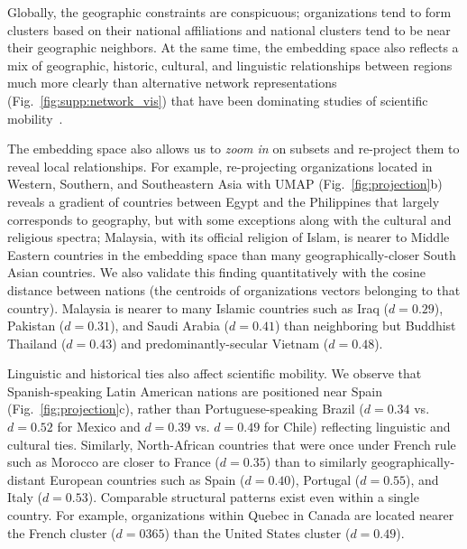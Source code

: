 \documentclass[12pt]{article} %
\begin{document}
Globally, the geographic constraints are conspicuous; organizations tend to form clusters based on their national affiliations and national clusters tend to be near their geographic neighbors.
At the same time, the embedding space also reflects a mix of geographic, historic, cultural, and linguistic relationships between regions much more clearly than alternative network representations (Fig.~\ref{fig:supp:network_vis}) that have been dominating studies of scientific mobility~\autocite{chinchilla2018global, czaika2018globalisation}.

The embedding space also allows us to \textit{zoom in} on subsets and re-project them to reveal local relationships.
For example, re-projecting organizations located in Western, Southern, and Southeastern Asia with UMAP (Fig.~\ref{fig:projection}b) reveals a gradient of countries between Egypt and the Philippines that largely corresponds to geography, but with some exceptions along with the cultural and religious spectra;
Malaysia, with its official religion of Islam, is nearer to Middle Eastern countries in the embedding space than many geographically-closer South Asian countries.
We also validate this finding quantitatively with the cosine distance between nations (the centroids of organizations vectors belonging to that country). 
Malaysia is nearer to many Islamic countries such as Iraq ($d = 0.29$), Pakistan ($d = 0.31$), and Saudi Arabia ($d = 0.41$)  than neighboring but Buddhist Thailand ($d = 0.43$) and predominantly-secular Vietnam ($d = 0.48$). 

Linguistic and historical ties also affect scientific mobility.
We observe that Spanish-speaking Latin American nations are positioned near Spain (Fig.~\ref{fig:projection}c), rather than Portuguese-speaking Brazil ($d = 0.34$ vs. $d = 0.52$ for Mexico and $d = 0.39$ vs. $d = 0.49$ for Chile) reflecting linguistic and cultural ties.
Similarly, North-African countries that were once under French rule such as Morocco are closer to France ($d =0.35$) than to similarly geographically-distant European countries such as Spain ($d = 0.40$), Portugal ($d = 0.55$), and Italy ($d = 0.53$).
Comparable structural patterns exist even within a single country.
For example, organizations within Quebec in Canada are located nearer the French cluster ($d = 0365$) than the United States cluster ($d = 0.49$).
\end{document}

